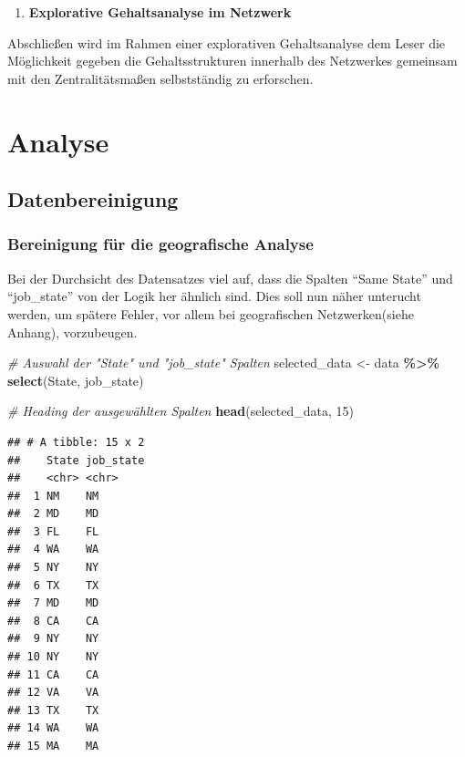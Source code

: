 \documentclass[
]{article}
\newenvironment{Shaded}{\begin{snugshade}}{\end{snugshade}}
\newcommand{\CommentTok}[1]{\textcolor[rgb]{0.56,0.35,0.01}{\textit{#1}}}
\newcommand{\DecValTok}[1]{\textcolor[rgb]{0.00,0.00,0.81}{#1}}
\newcommand{\FunctionTok}[1]{\textcolor[rgb]{0.13,0.29,0.53}{\textbf{#1}}}
\newcommand{\NormalTok}[1]{#1}
\newcommand{\OtherTok}[1]{\textcolor[rgb]{0.56,0.35,0.01}{#1}}
\newcommand{\SpecialCharTok}[1]{\textcolor[rgb]{0.81,0.36,0.00}{\textbf{#1}}}
\providecommand{\tightlist}{%
  \setlength{\itemsep}{0pt}\setlength{\parskip}{0pt}}
\begin{document}
\begin{enumerate}
\def\labelenumi{\arabic{enumi}.}
\setcounter{enumi}{3}
\tightlist
\item
  \textbf{Explorative Gehaltsanalyse im Netzwerk}
\end{enumerate}

Abschließen wird im Rahmen einer explorativen Gehaltsanalyse dem Leser
die Möglichkeit gegeben die Gehaltsstrukturen innerhalb des Netzwerkes
gemeinsam mit den Zentralitätsmaßen selbstständig zu erforschen.

\newpage

\section{Analyse}\label{analyse}

\subsection{Datenbereinigung}\label{datenbereinigung}

\subsubsection{Bereinigung für die geografische
Analyse}\label{bereinigung-fuxfcr-die-geografische-analyse}

Bei der Durchsicht des Datensatzes viel auf, dass die Spalten ``Same
State'' und ``job\_state'' von der Logik her ähnlich sind. Dies soll nun
näher unterucht werden, um spätere Fehler, vor allem bei geografischen
Netzwerken(siehe Anhang), vorzubeugen.

\begin{Shaded}
\begin{Highlighting}[]
\CommentTok{\# Auswahl der "State" und "job\_state" Spalten}
\NormalTok{selected\_data }\OtherTok{\textless{}{-}}\NormalTok{ data }\SpecialCharTok{\%\textgreater{}\%}
  \FunctionTok{select}\NormalTok{(State, job\_state)}

\CommentTok{\# Heading der ausgewählten Spalten}
\FunctionTok{head}\NormalTok{(selected\_data, }\DecValTok{15}\NormalTok{)}
\end{Highlighting}
\end{Shaded}

\begin{verbatim}
## # A tibble: 15 x 2
##    State job_state
##    <chr> <chr>    
##  1 NM    NM       
##  2 MD    MD       
##  3 FL    FL       
##  4 WA    WA       
##  5 NY    NY       
##  6 TX    TX       
##  7 MD    MD       
##  8 CA    CA       
##  9 NY    NY       
## 10 NY    NY       
## 11 CA    CA       
## 12 VA    VA       
## 13 TX    TX       
## 14 WA    WA       
## 15 MA    MA
\end{verbatim}
\end{document}
